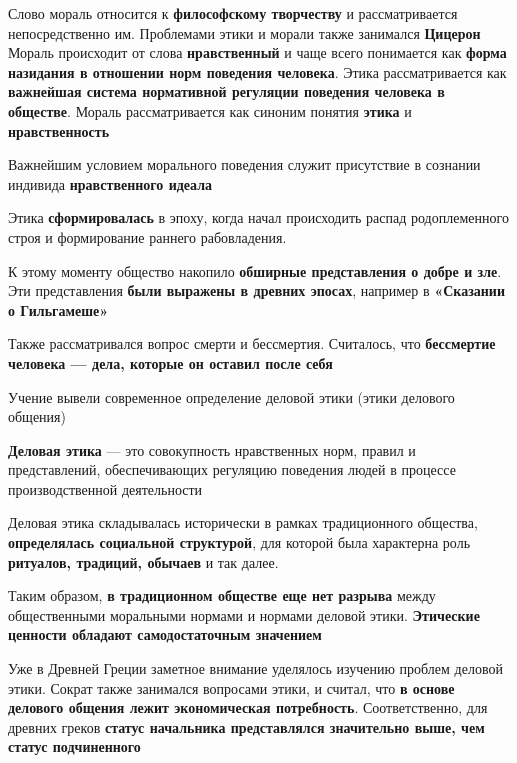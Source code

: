 Слово мораль относится к \textbf{философскому творчеству} и рассматривается непосредственно им. Проблемами этики и морали также занимался \textbf{Цицерон} Мораль происходит от слова \textbf{нравственный} и чаще всего понимается как \textbf{форма назидания в отношении норм поведения человека}. Этика рассматривается как \textbf{важнейшая система нормативной регуляции поведения человека в обществе}. Мораль рассматривается как синоним понятия \textbf{этика} и \textbf{нравственность}

\hfill

Важнейшим условием морального поведения служит присутствие в сознании индивида \textbf{нравственного идеала}

Этика \textbf{сформировалась} в эпоху, когда начал происходить распад родоплеменного строя и формирование раннего рабовладения.

К этому моменту общество накопило \textbf{обширные представления о добре и зле}. Эти представления \textbf{были выражены в древних эпосах}, например в \textbf{«Сказании о Гильгамеше»}

Также рассматривался вопрос смерти и бессмертия. Считалось, что \textbf{бессмертие человека — дела, которые он оставил после себя}

Учение вывели современное определение деловой этики (этики делового общения)

\begin{definition}
\textbf{Деловая этика} — это совокупность нравственных норм, правил и представлений, обеспечивающих регуляцию поведения людей в процессе производственной деятельности
\end{definition}

Деловая этика складывалась исторически в рамках традиционного общества, \textbf{определялась социальной структурой}, для которой была характерна роль \textbf{ритуалов, традиций, обычаев} и так далее.

Таким образом, \textbf{в традиционном обществе еще нет разрыва} между общественными моральными нормами и нормами деловой этики. \textbf{Этические ценности обладают самодостаточным значением}

Уже в Древней Греции заметное внимание уделялось изучению проблем деловой этики. Сократ также занимался вопросами этики, и считал, что \textbf{в основе делового общения лежит экономическая потребность}. Соответственно, для древних греков \textbf{статус начальника представлялся значительно выше, чем статус подчиненного}

\hfill

